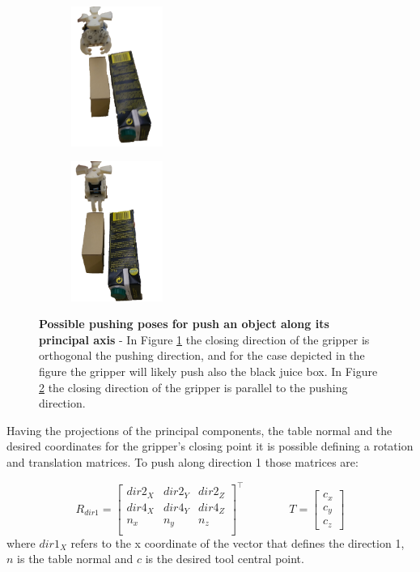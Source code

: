 \begin{figure}[tb]
\centering
\begin{subfigure}[t]{0.45\textwidth}
\centering
\includegraphics[width=3cm]{Img/pushing/pushing333.png}
\caption{}\label{fig:pushing_way1}
\end{subfigure}
\begin{subfigure}[t]{0.45\textwidth}
\centering
\includegraphics[width=3cm]{Img/pushing/pushing222.png}
\caption{}\label{fig:pushing_way2}
\end{subfigure}
\caption{\textbf{Possible pushing poses for push an object along its principal axis} - In Figure \ref{fig:pushing_way1} the closing direction of the gripper is orthogonal  the pushing direction, and for the case depicted in the figure the gripper will likely push also the black juice box. In Figure \ref{fig:pushing_way2} the closing direction of the gripper is parallel to the pushing direction.}\label{fig:pushing_way}
\end{figure}

Having the projections of the principal components, the table normal and the desired coordinates for the gripper's closing point it is possible defining a rotation and translation matrices. To push along direction 1 those matrices are:

\begin{equation}
R_{dir1} =
\begin{bmatrix}
dir2_X & dir2_Y & dir2_Z \\
dir4_X & dir4_Y & dir4_Z \\
n_x & n_y & n_z \\
\end{bmatrix}^{\top}
\qquad \qquad
T=
\begin{bmatrix}
c_x \\ c_y \\ c_z
\end{bmatrix}
\label{eq:transform}
\end{equation}
where $dir1_X$ refers to the x coordinate of the vector that defines the direction 1, $n$ is the table normal and $c$ is the desired tool central point. 


